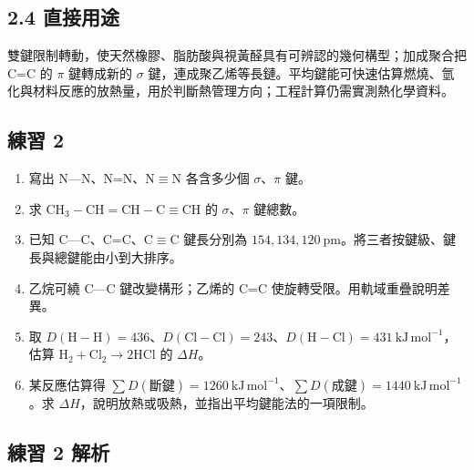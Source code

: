 \documentclass[11pt,a4paper]{article}
\providecommand{\tightlist}{%
  \setlength{\itemsep}{0pt}\setlength{\parskip}{0pt}}
\begin{document}
\subsection{2.4 直接用途}\label{ux76f4ux63a5ux7528ux9014}

雙鍵限制轉動，使天然橡膠、脂肪酸與視黃醛具有可辨認的幾何構型；加成聚合把 C=C 的 \(\pi\) 鍵轉成新的 \(\sigma\) 鍵，連成聚乙烯等長鏈。平均鍵能可快速估算燃燒、氫化與材料反應的放熱量，用於判斷熱管理方向；工程計算仍需實測熱化學資料。

\subsection{練習 2}\label{ux7df4ux7fd2-2}

\begin{enumerate}
\def\labelenumi{\arabic{enumi}.}
\tightlist
\item
  寫出 N---N、N=N、N\(\equiv\)N 各含多少個 \(\sigma\)、\(\pi\) 鍵。
\item
  求 \(\mathrm{CH_3-CH=CH-C\equiv CH}\) 的 \(\sigma\)、\(\pi\) 鍵總數。
\item
  已知 C---C、C=C、C\(\equiv\)C 鍵長分別為 \(154,134,120\ \mathrm{pm}\)。將三者按鍵級、鍵長與總鍵能由小到大排序。
\item
  乙烷可繞 C---C 鍵改變構形；乙烯的 C=C 使旋轉受限。用軌域重疊說明差異。
\item
  取 \(D(\mathrm{H-H})=436\)、\(D(\mathrm{Cl-Cl})=243\)、\(D(\mathrm{H-Cl})=431\ \mathrm{kJ\,mol^{-1}}\)，估算 \(\mathrm{H_2+Cl_2\rightarrow2HCl}\) 的 \(\Delta H\)。
\item
  某反應估算得 \(\sum D(\text{斷鍵})=1260\ \mathrm{kJ\,mol^{-1}}\)、\(\sum D(\text{成鍵})=1440\ \mathrm{kJ\,mol^{-1}}\)。求 \(\Delta H\)，說明放熱或吸熱，並指出平均鍵能法的一項限制。
\end{enumerate}

\subsection{練習 2 解析}\label{ux7df4ux7fd2-2-ux89e3ux6790}
\end{document}

